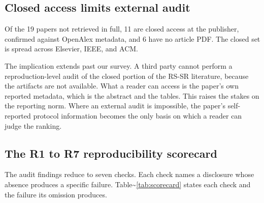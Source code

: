\documentclass{interact}
\begin{document}
\subsection{Closed access limits external audit}\label{sec:closed}

Of the 19 papers not retrieved in full, 11 are closed access at the publisher, confirmed against OpenAlex metadata, and 6 have no article PDF. The closed set is spread across Elsevier, IEEE, and ACM.

The implication extends past our survey. A third party cannot perform a reproduction-level audit of the closed portion of the RS-SR literature, because the artifacts are not available. What a reader can access is the paper's own reported metadata, which is the abstract and the tables. This raises the stakes on the reporting norm. Where an external audit is impossible, the paper's self-reported protocol information becomes the only basis on which a reader can judge the ranking.

\subsection{The R1 to R7 reproducibility scorecard}\label{sec:scorecard}

The audit findings reduce to seven checks. Each check names a disclosure whose absence produces a specific failure. Table\textasciitilde{}\ref{tab:scorecard} states each check and the failure its omission produces.
\end{document}
